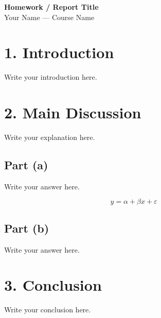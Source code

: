 \documentclass[11pt,letterpaper]{article}
\begin{document}
\begin{center}
    {\LARGE\bfseries Homework / Report Title}\\[6pt]
    {\large Your Name --- Course Name}\\[3pt]
\end{center}

\section*{1. Introduction}
Write your introduction here.

\section*{2. Main Discussion}
Write your explanation here.

\subsection*{Part (a)}
Write your answer here.

\begin{equation}
    y = \alpha + \beta x + \varepsilon
\end{equation}

\subsection*{Part (b)}
Write your answer here.

\section*{3. Conclusion}
Write your conclusion here.

% 
% 
\end{document}
